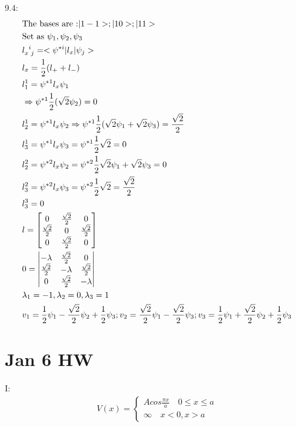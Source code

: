 \documentclass{article}
\begin{document}
  9.4:
  \begin{align*}
&\text{The bases are :}|1-1>;|10>;|11> \\
&\text{Set as } \psi_1,\psi_2,\psi_3 \\
& \tensor {l}{_x^i_{j}}=<\psi^{*i}|l_x|\psi_j> \\
&l_x=\frac12(l_++l_-) \\
&l^1_1=\psi^{*1}l_x\psi_1 \\
&\Rightarrow \psi^{*1}\frac12(\sqrt{2}\psi_2)=0 \\
&l^1_2=\psi^{*1}l_x\psi_2\Rightarrow \psi^{*1}\frac12(\sqrt{2}\psi_1+\sqrt{2}\psi_3)=\frac{\sqrt{2}}2 \\
&l^1_3=\psi^{*1}l_x\psi_3=\psi^{*1}\frac12{\sqrt{2}}=0 \\
&l^2_2=\psi^{*2}l_x\psi_2=\psi^{*2}\frac12{\sqrt{2}\psi_1+\sqrt{2}\psi_3}=0 \\
&l^2_3=\psi^{*2}l_x\psi_3=\psi^{*2}\frac12{\sqrt{2}}=\frac{\sqrt{2}} 2\\
&l^3_3=0 \\
&l=\begin{bmatrix}0&\frac{\sqrt{2}}2&0\\
\frac{\sqrt{2}}2&0&\frac{\sqrt{2}}2\\
0&\frac{\sqrt{2}}2&0\end{bmatrix} \\
&0=\begin{vmatrix}-\lambda&\frac{\sqrt{2}}2&0\\
\frac{\sqrt{2}}2&-\lambda&\frac{\sqrt{2}}2\\
0&\frac{\sqrt{2}}2&-\lambda\end{vmatrix} \\
&\lambda_1=-1,\lambda_2=0,\lambda_3=1 \\
&v_1=\frac12\psi_1-\frac{\sqrt{2}}2\psi_2+\frac12\psi_3;v_2=\frac{\sqrt{2}}2\psi_1-\frac{\sqrt{2}}2\psi_3;v_3=\frac12\psi_1+\frac{\sqrt{2}}2\psi_2+\frac12\psi_3 \\
  \end{align*}

  \section{Jan 6 HW}

  I:
  \begin{align*}
    V(x)=\begin{cases}
      Acos\frac{\pi x}a\quad0\le x\le a\\
      \infty \quad x<0,x>a
    \end{cases}
  \end{align*}
\end{document}
